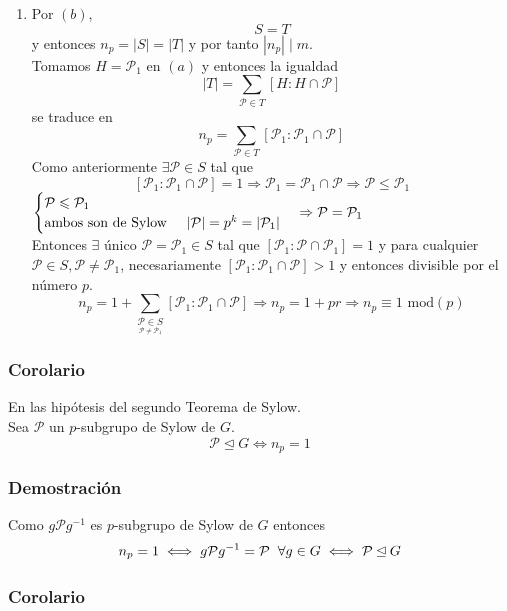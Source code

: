 \documentclass[11pt,a4paper]{article}
\begin{document}
\begin{enumerate}[label = (\alph*)]
\item Por $(b)$,
$$S = T$$
y entonces $n_{p} = |S| = |T|$ y por tanto $|n_{p}| \mid m$. \\
Tomamos $H = \mathcal{P}_{1}$ en $(a)$ y entonces la igualdad
$$|T| = \sum_{\mathcal{P} \in T} [H : H \cap \mathcal{P}]$$
se traduce en
$$n_{p} = \sum_{\mathcal{P} \in T} [\mathcal{P}_{1} : \mathcal{P}_{1} \cap \mathcal{P}]$$
Como anteriormente $\exists \mathcal{P} \in S$ tal que
$$[\mathcal{P}_{1} : \mathcal{P}_{1} \cap \mathcal{P}] = 1 \Rightarrow \mathcal{P}_{1} = \mathcal{P}_{1} \cap \mathcal{P} \Rightarrow \mathcal{P} \leqslant \mathcal{P}_{1}$$
$\begin{cases}
\mathcal{P} \leqslant \mathcal{P}_{1} \\
\text{ambos son de Sylow} \hspace{0.5cm} |\mathcal{P}| = p^{k} = |\mathcal{P}_{1}|
\end{cases}
\Rightarrow \mathcal{P} = \mathcal{P}_{1}$ \\
Entonces $\exists$ único $\mathcal{P} = \mathcal{P}_{1} \in S$ tal que $[\mathcal{P}_{1} : \mathcal{P} \cap \mathcal{P}_{1}] = 1$ y para cualquier $\mathcal{P} \in S, \mathcal{P} \neq \mathcal{P}_{1}$, necesariamente $[\mathcal{P}_{1} : \mathcal{P}_{1} \cap \mathcal{P}] > 1$ y entonces divisible por el número $p$.
$$n_{p} = 1 + \sum_{\underset{\mathcal{P} \neq \mathcal{P}_{1}}{\mathcal{P} \in S}} [\mathcal{P}_{1} : \mathcal{P}_{1} \cap \mathcal{P}] \Rightarrow n_{p} = 1 + pr \Rightarrow n_{p} \equiv 1 \text{ mod} (p)$$
\end{enumerate}

\subsubsection*{Corolario}

En las hipótesis del segundo Teorema de Sylow. \\
Sea $\mathcal{P}$ un $p$-subgrupo de Sylow de $G$.
$$\mathcal{P} \unlhd G \iff n_{p} = 1$$

\subsubsection*{Demostración}

Como $g \mathcal{P} g^{-1}$ es $p$-subgrupo de Sylow de $G$ entonces
$$n_{p} = 1 \iff g \mathcal{P} g^{-1} = \mathcal{P} \hspace{0.2cm} \forall g \in G \iff \mathcal{P} \unlhd G$$

\subsubsection*{Corolario}
\end{document}
